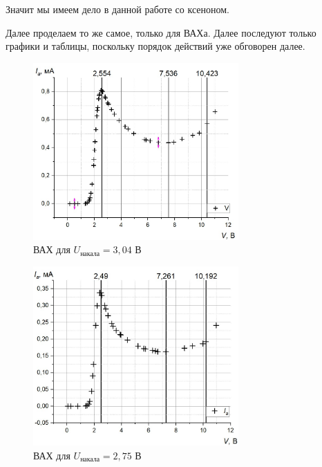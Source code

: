 \documentclass[a4paper, 12pt]{article}%
\begin{document}
Значит мы имеем дело в данной работе со ксеноном.

Далее проделаем то же самое, только для ВАХа. Далее последуют только графики и таблицы, поскольку порядок действий уже обговорен далее.
\begin{figure}[h]
\begin{center}
\includegraphics[width = 0.7\textwidth]{5.jpg}
\caption{ВАХ для $U_{\text{накала}} = 3,04$ В}
\end{center}
\end{figure}
\newpage
\begin{figure}[h]
\begin{center}
\includegraphics[width = 0.7\textwidth]{6.jpg}
\caption{ВАХ для $U_{\text{накала}} = 2,75$ В}
\end{center}
\end{figure}
\end{document}
